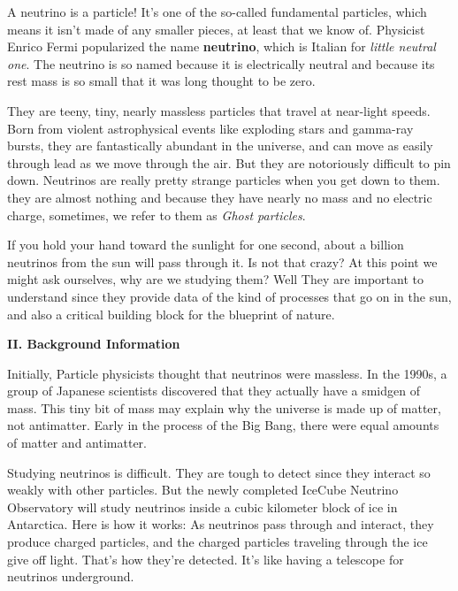 \documentclass[fleqn]{article}
\begin{document}
  A neutrino is a particle! It’s one of the so-called fundamental particles, which means it isn’t made of any 
  smaller pieces, at least that we know of. Physicist Enrico Fermi popularized the name \textbf{neutrino}, 
  which is Italian for \emph{little neutral one}. The neutrino is so named because it is electrically neutral 
  and because its rest mass is so small that it was long thought to be zero. \textcite{One}

  They are teeny, tiny, nearly massless particles that travel at near-light speeds. Born from violent astrophysical events 
  like exploding stars and gamma-ray bursts, they are fantastically abundant in the universe, and can move as easily through 
  lead as we move through the air. But they are notoriously difficult to pin down. Neutrinos are really pretty strange particles 
  when you get down to them. they are almost nothing and because they have nearly no mass and no electric charge, sometimes, 
  we refer to them as \emph{Ghost particles}.

  If you hold your hand toward the sunlight for one second, about a billion neutrinos from the sun will pass through it. Is not that crazy? 
  At this point we might ask ourselves, why are we studying them? Well They are important to understand since they provide data of the kind 
  of processes that go on in the sun, and also a critical building block for the blueprint of nature.

  \vspace{20px}

  \textbf{II. Background Information}

  \vspace{10px}

  Initially, Particle physicists thought that neutrinos were massless. In the 1990s, a group of Japanese scientists discovered that they 
  actually have a smidgen of mass. This tiny bit of mass may explain why the universe is made up of matter, not antimatter. Early in the 
  process of the Big Bang, there were equal amounts of matter and antimatter. \textcite{Two}

  Studying neutrinos is difficult. They are tough to detect since they interact so weakly with other particles. But the newly completed 
  IceCube Neutrino Observatory will study neutrinos inside a cubic kilometer block of ice in Antarctica. Here is how it works: 
  As neutrinos pass through and interact, they produce charged particles, and the charged particles traveling through the ice give off light.
  That’s how they’re detected. It’s like having a telescope for neutrinos underground.
\end{document}
